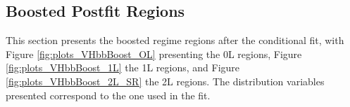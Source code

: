 \subsection{Boosted Postfit Regions}\label{appsec-vh-analRegBooPosfit}
This section presents the boosted regime regions after the conditional fit, with Figure \ref{fig:plots_VHbbBoost_OL} presenting the 0L regions, Figure \ref{fig:plots_VHbbBoost_1L} the 1L regions, and Figure \ref{fig:plots_VHbbBoost_2L_SR} the 2L regions. The distribution variables presented correspond to the one used in the fit.

\clearpage

\clearpage 

\clearpage
